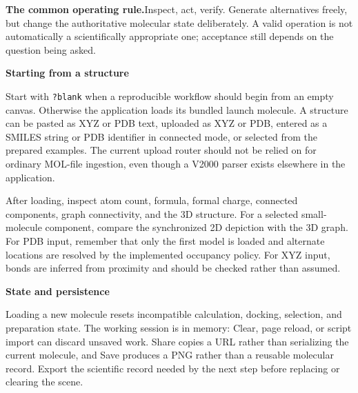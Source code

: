 \documentclass[10pt,letterpaper]{article}
\newcommand{\code}[1]{\texttt{#1}}
\newcommand{\lead}[1]{\textbf{#1}\hspace{0.35em}}
\newcommand{\subhead}[1]{%
  \par\needspace{2\baselineskip}\vspace{2.5pt}%
  {\fontsize{10.91}{13.1}\selectfont\bfseries #1}\par\vspace{-1.5pt}}
\begin{document}
\lead{The common operating rule.}Inspect, act, verify. Generate alternatives freely, but change the authoritative molecular state deliberately. A valid operation is not automatically a scientifically appropriate one; acceptance still depends on the question being asked.

\subhead{Starting from a structure}

Start with \code{?blank} when a reproducible workflow should begin from an empty canvas. Otherwise the application loads its bundled launch molecule. A structure can be pasted as XYZ or PDB text, uploaded as XYZ or PDB, entered as a SMILES string or PDB identifier in connected mode, or selected from the prepared examples. The current upload router should not be relied on for ordinary MOL-file ingestion, even though a V2000 parser exists elsewhere in the application.

After loading, inspect atom count, formula, formal charge, connected components, graph connectivity, and the 3D structure. For a selected small-molecule component, compare the synchronized 2D depiction with the 3D graph. For PDB input, remember that only the first model is loaded and alternate locations are resolved by the implemented occupancy policy. For XYZ input, bonds are inferred from proximity and should be checked rather than assumed.

\subhead{State and persistence}

Loading a new molecule resets incompatible calculation, docking, selection, and preparation state. The working session is in memory: Clear, page reload, or script import can discard unsaved work. Share copies a URL rather than serializing the current molecule, and Save produces a PNG rather than a reusable molecular record. Export the scientific record needed by the next step before replacing or clearing the scene.
\end{document}
